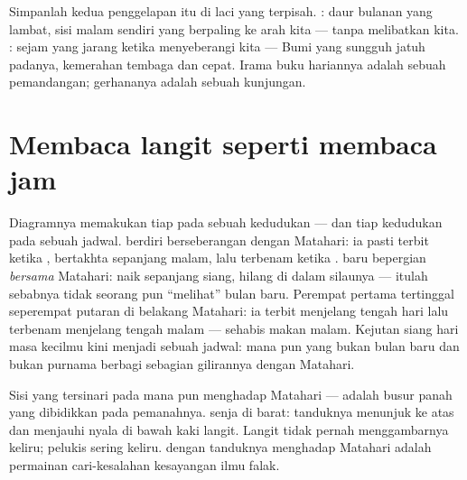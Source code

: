 \begin{example}\label{ex:g7:moon-phases:eclipsevs}
Simpanlah kedua penggelapan  itu di laci yang terpisah.
\emph{}: daur bulanan yang lambat, sisi malam  sendiri yang
berpaling ke arah kita --- tanpa melibatkan  kita.
\emph{}: sejam yang jarang ketika 
menyeberangi  kita ---  Bumi yang sungguh jatuh
padanya, kemerahan tembaga dan cepat. Irama buku hariannya adalah
sebuah pemandangan; gerhananya adalah sebuah kunjungan.
\end{example}

\section{Membaca langit seperti membaca jam}

\begin{example}\label{ex:g7:moon-phases:hours}
Diagramnya memakukan tiap  pada sebuah kedudukan --- dan tiap
kedudukan pada sebuah jadwal.  berdiri berseberangan
dengan Matahari: ia pasti terbit ketika , bertakhta
sepanjang malam, lalu terbenam ketika .  baru
bepergian \emph{bersama} Matahari: naik sepanjang siang, hilang di
dalam silaunya --- itulah sebabnya tidak seorang pun ``melihat''
bulan baru. Perempat pertama tertinggal seperempat putaran di belakang
Matahari: ia terbit menjelang tengah hari lalu terbenam menjelang
tengah malam ---  sehabis makan malam. Kejutan  siang hari
masa kecilmu kini menjadi sebuah jadwal:  mana pun yang bukan
bulan baru dan bukan purnama berbagi sebagian gilirannya dengan
Matahari.
\end{example}

\begin{example}\label{ex:g7:moon-phases:points}
Sisi yang tersinari pada  mana pun menghadap Matahari --- 
adalah busur panah yang dibidikkan pada pemanahnya.  senja di
barat: tanduknya menunjuk ke atas dan menjauhi nyala 
di bawah kaki langit. Langit tidak pernah menggambarnya keliru; pelukis
sering keliru.  dengan tanduknya menghadap Matahari adalah
permainan cari-kesalahan kesayangan ilmu falak.
\end{example}

